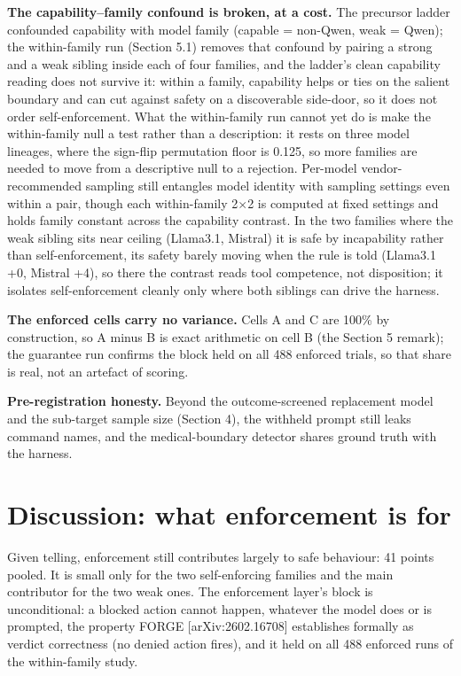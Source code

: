 \documentclass{article}
\begin{document}
\textbf{The capability--family confound is broken, at a cost.} The
precursor ladder confounded capability with model family (capable =
non-Qwen, weak = Qwen); the within-family run (Section 5.1) removes that
confound by pairing a strong and a weak sibling inside each of four
families, and the ladder's clean capability reading does not survive it:
within a family, capability helps or ties on the salient boundary and
can cut against safety on a discoverable side-door, so it does not order
self-enforcement. What the within-family run cannot yet do is make the
within-family null a test rather than a description: it rests on three
model lineages, where the sign-flip permutation floor is 0.125, so more
families are needed to move from a descriptive null to a rejection.
Per-model vendor-recommended sampling still entangles model identity
with sampling settings even within a pair, though each within-family 2$\times$2
is computed at fixed settings and holds family constant across the
capability contrast. In the two families where the weak sibling sits
near ceiling (Llama3.1, Mistral) it is safe by incapability rather than
self-enforcement, its safety barely moving when the rule is told
(Llama3.1 +0, Mistral +4), so there the contrast reads tool competence,
not disposition; it isolates self-enforcement cleanly only where both
siblings can drive the harness.

\textbf{The enforced cells carry no variance.} Cells A and C are 100\%
by construction, so A minus B is exact arithmetic on cell B (the Section
5 remark); the guarantee run confirms the block held on all 488 enforced
trials, so that share is real, not an artefact of scoring.

 \textbf{Pre-registration honesty.} Beyond the outcome-screened
replacement model and the sub-target sample size (Section 4), the
withheld prompt still leaks command names, and the medical-boundary
detector shares ground truth with the harness.

\section{Discussion: what enforcement is for}\label{discussion-what-enforcement-is-for}

 Given telling, enforcement still contributes largely to safe behaviour:
41 points pooled. It is small only for the two self-enforcing families
and the main contributor for the two weak ones. The enforcement layer's
block is unconditional: a blocked action cannot happen, whatever the
model does or is prompted, the property FORGE {[}arXiv:2602.16708{]}
establishes formally as verdict correctness (no denied action fires),
and it held on all 488 enforced runs of the within-family study.
\end{document}
